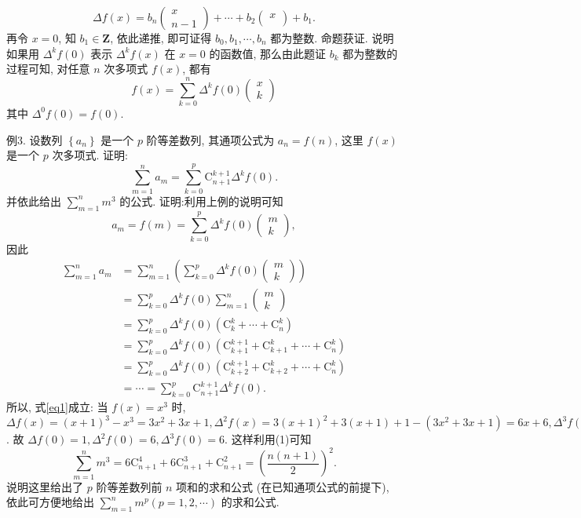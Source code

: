 $$
\Delta f(x)=b_n\left(\begin{array}{c}
x \\
n-1
\end{array}\right)+\cdots+b_2\left(\begin{array}{l}
x \\
\end{array}\right)+b_1 .
$$
再令 $x=0$, 知 $b_1 \in \mathbf{Z}$, 依此递推, 即可证得 $b_0, b_1, \cdots, b_n$ 都为整数.
命题获证.
说明如果用 $\Delta^k f(0)$ 表示 $\Delta^k f(x)$ 在 $x=0$ 的函数值, 那么由此题证 $b_k$ 都为整数的过程可知, 对任意 $n$ 次多项式 $f(x)$, 都有
$$
f(x)=\sum_{k=0}^n \Delta^k f(0)\left(\begin{array}{l}
x \\
k
\end{array}\right)
$$
其中 $\Delta^0 f(0)=f(0)$.



例3. 设数列 $\left\{a_n\right\}$ 是一个 $p$ 阶等差数列, 其通项公式为 $a_n=f(n)$, 这里
$f(x)$ 是一个 $p$ 次多项式.
证明:
$$
\sum_{m=1}^n a_m=\sum_{k=0}^p \mathrm{C}_{n+1}^{k+1} \Delta^k f(0) . \label{eq1}
$$
并依此给出 $\sum_{m=1}^n m^3$ 的公式.
证明:利用上例的说明可知
$$
a_m=f(m)=\sum_{k=0}^p \Delta^k f(0)\left(\begin{array}{l}
m \\
k
\end{array}\right),
$$
因此
$$
\begin{aligned}
\sum_{m=1}^n a_m & =\sum_{m=1}^n\left(\sum_{k=0}^p \Delta^k f(0)\left(\begin{array}{l}
m \\
k
\end{array}\right)\right) \\
& =\sum_{k=0}^p \Delta^k f(0) \sum_{m=1}^n\left(\begin{array}{l}
m \\
k
\end{array}\right) \\
& =\sum_{k=0}^p \Delta^k f(0)\left(\mathrm{C}_k^k+\cdots+\mathrm{C}_n^k\right) \\
& =\sum_{k=0}^p \Delta^k f(0)\left(\mathrm{C}_{k+1}^{k+1}+\mathrm{C}_{k+1}^k+\cdots+\mathrm{C}_n^k\right) \\
& =\sum_{k=0}^p \Delta^k f(0)\left(\mathrm{C}_{k+2}^{k+1}+\mathrm{C}_{k+2}^k+\cdots+\mathrm{C}_n^k\right) \\
& =\cdots=\sum_{k=0}^p \mathrm{C}_{n+1}^{k+1} \Delta^k f(0) .
\end{aligned}
$$
所以, 式\ref{eq1}成立:
当 $f(x)=x^3$ 时, $\Delta f(x)=(x+1)^3-x^3=3 x^2+3 x+1, \Delta^2 f(x)= 3(x+1)^2+3(x+1)+1-\left(3 x^2+3 x+1\right)=6 x+6, \Delta^3 f(x)=6(x+1)+6- (6 x+6)=6$. 故 $\Delta f(0)=1, \Delta^2 f(0)=6, \Delta^3 f(0)=6$. 这样利用(1)可知
$$
\sum_{m=1}^n m^3=6 \mathrm{C}_{n+1}^4+6 \mathrm{C}_{n+1}^3+\mathrm{C}_{n+1}^2=\left(\frac{n(n+1)}{2}\right)^2 .
$$
说明这里给出了 $p$ 阶等差数列前 $n$ 项和的求和公式 (在已知通项公式的前提下), 依此可方便地给出 $\sum_{m=1}^n m^p(p=1,2, \cdots)$ 的求和公式.



